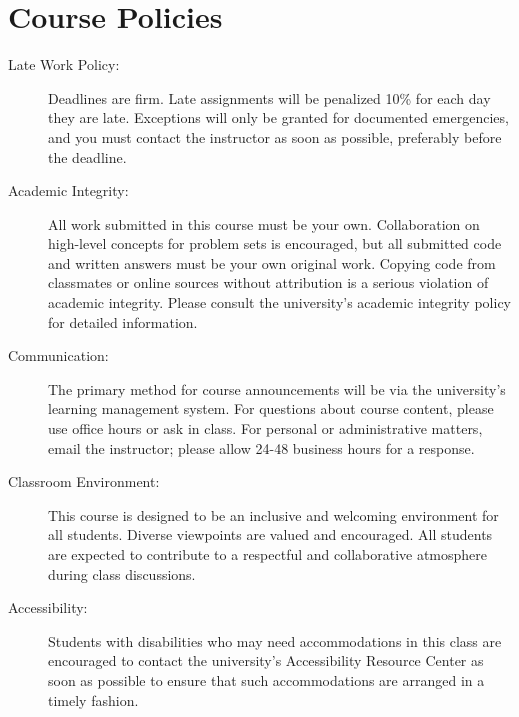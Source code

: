 \documentclass[11pt]{article}
\begin{document}
\vspace{6mm}
\section*{Course Policies}
\begin{description}
  \item[Late Work Policy:] Deadlines are firm. Late assignments will be penalized 10\% for each day they are late. Exceptions will only be granted for documented emergencies, and you must contact the instructor as soon as possible, preferably before the deadline.
  \item[Academic Integrity:] All work submitted in this course must be your own. Collaboration on high-level concepts for problem sets is encouraged, but all submitted code and written answers must be your own original work. Copying code from classmates or online sources without attribution is a serious violation of academic integrity. Please consult the university's academic integrity policy for detailed information.
  \item[Communication:] The primary method for course announcements will be via the university's learning management system. For questions about course content, please use office hours or ask in class. For personal or administrative matters, email the instructor; please allow 24-48 business hours for a response.
  \item[Classroom Environment:] This course is designed to be an inclusive and welcoming environment for all students. Diverse viewpoints are valued and encouraged. All students are expected to contribute to a respectful and collaborative atmosphere during class discussions.
  \item[Accessibility:] Students with disabilities who may need accommodations in this class are encouraged to contact the university's Accessibility Resource Center as soon as possible to ensure that such accommodations are arranged in a timely fashion.
\end{description}
\end{document}

